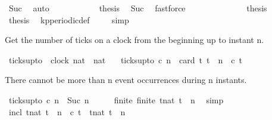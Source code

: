 \begin{isabellebody}
\ Suc\ \isamarkupfalse%
\ auto\isanewline
\ \ \ \ \ \ \ \ \isamarkupfalse%
\ \isamarkupfalse%
\ {\isacharquery}thesis\ \isamarkupfalse%
\ Suc\ \isamarkupfalse%
\ fastforce\isanewline
\ \ \ \ \ \ \isamarkupfalse%
\isanewline
\ \ \ \ \isacommand{{\isacharbraceright}}\isamarkupfalse%
\ \isamarkupfalse%
\ {\isacharquery}thesis\ \isacommand{{\isachardot}{\isachardot}}\isamarkupfalse%
\isanewline
\ \ \isamarkupfalse%
\isanewline
\ \ \isamarkupfalse%
\ {\isacharquery}thesis\ \isamarkupfalse%
\ kp{\isacharunderscore}periodic{\isacharunderscore}def\ \isamarkupfalse%
\ {}\ \isamarkupfalse%
\ simp\isanewline
{}\isamarkupfalse%
%
\endisatagproof
{\isafoldproof}%
%
\isadelimproof
%
\endisadelimproof
%
\begin{isamarkuptext}%
Get the number of ticks on a clock from the beginning up to instant n.%
\end{isamarkuptext}\isamarkuptrue%
\isamarkupfalse%
\ ticks{\isacharunderscore}up{\isacharunderscore}to\ {\isacharcolon}{\isacharcolon}\ {\isacartoucheopen}{\isacharbrackleft}clock{\isacharcomma}\ nat{\isacharbrackright}\ {\isasymRightarrow}\ nat{\isacartoucheclose}\isanewline
\ \ \ {\isacartoucheopen}ticks{\isacharunderscore}up{\isacharunderscore}to\ c\ n\ {\isacharequal}\ card\ {\isacharbraceleft}t{\isachardot}\ t\ {\isasymle}\ n\ {\isasymand}\ c\ t{\isacharbraceright}{\isacartoucheclose}%
\begin{isamarkuptext}%
There cannot be more than n event occurrences during n instants.%
\end{isamarkuptext}\isamarkuptrue%
\isamarkupfalse%
\ {\isacartoucheopen}ticks{\isacharunderscore}up{\isacharunderscore}to\ c\ n\ {\isasymle}\ Suc\ n{\isacartoucheclose}\isanewline
%
\isadelimproof
%
\endisadelimproof
%
\isatagproof
{}\isamarkupfalse%
\ {\isacharminus}\isanewline
\ \ \isamarkupfalse%
\ finite{\isacharcolon}\ {\isacartoucheopen}finite\ {\isacharbraceleft}t{\isacharcolon}{\isacharcolon}nat{\isachardot}\ t\ {\isasymle}\ n{\isacharbraceright}{\isacartoucheclose}\ \isamarkupfalse%
\ simp\isanewline
\ \ \isamarkupfalse%
\ incl{\isacharcolon}\ {\isacartoucheopen}{\isacharbraceleft}t{\isacharcolon}{\isacharcolon}nat{\isachardot}\ t\ {\isasymle}\ n\ {\isasymand}\ c\ t{\isacharbraceright}\ {\isasymsubseteq}\ {\isacharbraceleft}t{\isacharcolon}{\isacharcolon}nat{\isachardot}\ t\ {\isasymle}\ n{\isacharbraceright}{\isacartoucheclose}\ \isamarkupfalse%

\end{isabellebody}
